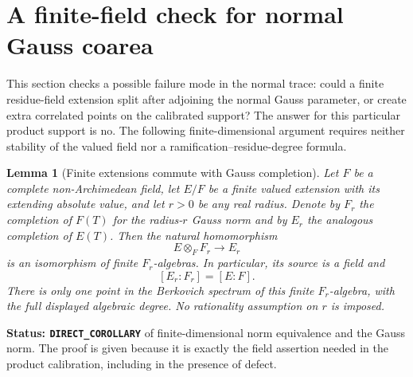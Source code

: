 \documentclass[11pt,a4paper]{article}
\numberwithin{equation}{section}
\newtheorem{lemma}[theorem]{Lemma}
\theoremstyle{definition}
\theoremstyle{remark}
\begin{document}


\section{A finite-field check for normal Gauss coarea}
\label{sec:r5-normal-gauss-calibration-check}

This section checks a possible failure mode in the normal trace:
could a finite residue-field extension split after adjoining the
normal Gauss parameter, or create extra correlated points on the
calibrated support?  The answer for this particular product support
is no.  The following finite-dimensional argument requires neither
stability of the valued field nor a ramification--residue-degree
formula.

\begin{lemma}[Finite extensions commute with Gauss completion]
\label{lem:r5-finite-gauss-completion}
Let $F$ be a complete non-Archimedean field, let $E/F$ be a
finite valued extension with its extending absolute value, and let
$r>0$ be any real radius.  Denote by $F_r$ the completion of
$F(T)$ for the radius-$r$ Gauss norm and by $E_r$ the analogous
completion of $E(T)$.  Then the natural homomorphism
\begin{equation}
                    E\otimes_F F_r\longrightarrow E_r
 \label{eq:r5-finite-gauss-completion}
\end{equation}
is an isomorphism of finite $F_r$-algebras.  In particular, its
source is a field and
\[
                         [E_r:F_r]=[E:F].
\]
There is only one point in the Berkovich spectrum of this finite
$F_r$-algebra, with the full displayed algebraic degree.  No
rationality assumption on $r$ is imposed.
\end{lemma}

\noindent\textbf{Status: \texttt{DIRECT\_COROLLARY}} of
finite-dimensional norm equivalence and the Gauss norm.  The
proof is given because it is exactly the field assertion needed
in the product calibration, including in the presence of defect.
\end{document}
